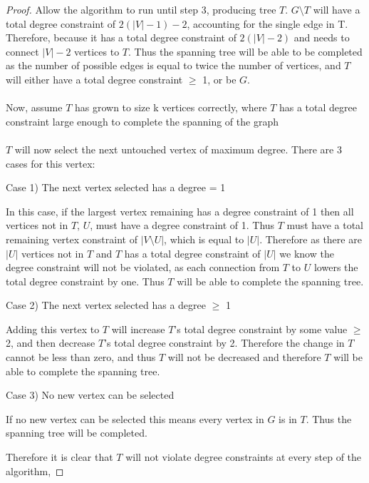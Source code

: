 \documentclass{article}
\begin{document}
	\begin{proof}
		Allow the algorithm to run until step 3, producing tree $T$. $G \setminus T$ will have a total degree constraint of $2(|V|-1)-2$, accounting for the single edge in T. Therefore, because it has a total degree constraint of $2(|V|-2)$ and needs to connect $|V|-2$ vertices to $T$. Thus the spanning tree will be able to be completed as the number of possible edges is equal to twice the number of vertices, and $T$ will either have a total degree constraint $\geq$ 1, or be $G$. 
		\\
		\\
		Now, assume $T$ has grown to size k vertices correctly, where $T$ has a total degree constraint large enough to complete the spanning of the graph
		\\\\
		$T$ will now select the next untouched vertex of maximum degree. There are 3 cases for this vertex:
		
		\setlength\parindent{12pt} 
		Case 1) The next vertex selected has a degree = 1 \par
		\setlength\parindent{24pt}\hangindent=24pt 
		In this case, if the largest vertex remaining has a degree constraint of 1 then all vertices not in $T$, $U$, must
		have a degree constraint of 1. Thus $T$ must have a total remaining vertex constraint of $|V \setminus U|$, which is equal to  $|U|$. Therefore as there are $|U|$ vertices not in $T$ and $T$ has a total degree constraint of $|U|$ we know the degree constraint will not be violated, as each connection from $T$ to $U$ lowers the total degree constraint by one.  Thus $T$ will be able to complete the spanning tree.
		\par
		
		\setlength\parindent{12pt}
		Case 2) The next vertex selected has a degree $\geq$ 1\par
		\setlength\parindent{24pt}\hangindent=24pt 
		Adding this vertex to $T$ will increase $T$'s total degree constraint by some value $\geq$ 2, and then decrease $T$'s total degree constraint by 2.
		Therefore the change in $T$ cannot be less than zero, and thus $T$ will not be decreased and therefore $T$ will be able to complete the spanning tree.
		\par
		
		
		\setlength\parindent{12pt}
		Case 3) No new vertex can be selected\par
		\setlength\parindent{24pt}\hangindent=24pt 
		If no new vertex can be selected this means every vertex in $G$ is in $T$. Thus the spanning tree will be completed.
		\par
		
		\setlength\parindent{0pt}\hangindent=0pt
		Therefore it is clear that $T$ will not violate degree constraints at every step of the algorithm,
		
	\end{proof}		
\end{document}
